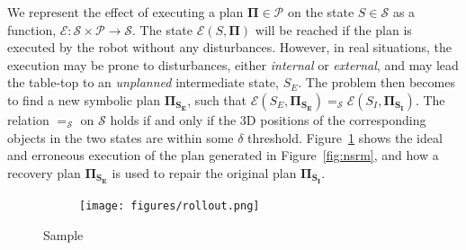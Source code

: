 We represent the effect of executing a plan $\mathbf{\Pi} \in \mathcal{P}$ on the state $S \in \mathcal{S}$ as a function, $\mathcal{E}: \mathcal{S} \times \mathcal{P} \rightarrow \mathcal{S}$. The state $\mathcal{E}(S, \mathbf{\Pi})$ will be reached if the plan is executed by the robot without any disturbances. However, in real situations, the execution may be prone to disturbances, either \textit{internal} or \textit{external}, and may lead the table-top to an \textit{unplanned} intermediate state, $S_E$. The problem then becomes to find a new symbolic plan $\mathbf{\Pi_{S_E}}$, such that $\mathcal{E}(S_E, \mathbf{\Pi_{S_E}}) =_\mathcal{S} \mathcal{E}(S_I, \mathbf{\Pi_{S_I}})$. The relation $=_\mathcal{S}$ on $\mathcal{S}$ holds if and only if the 3D positions of the corresponding objects in the two states are within some $\delta$ threshold. Figure~\ref{fig:rollout} shows the ideal and erroneous execution of the plan generated in Figure~\ref{fig:nsrm}, and how a recovery plan $\mathbf{\Pi_{S_E}}$ is used to repair the original plan $\mathbf{\Pi_{S_I}}$.

\begin{figure}[h!]
    \begin{subfigure}{1.0\hsize}
         \centering    
         \texttt{[image: figures/rollout.png]}
    \end{subfigure}
    \caption{
        \footnotesize{
            Sample
        }
    }
    \vspace{-0.15in}
    \label{fig:rollout}
\end{figure}


